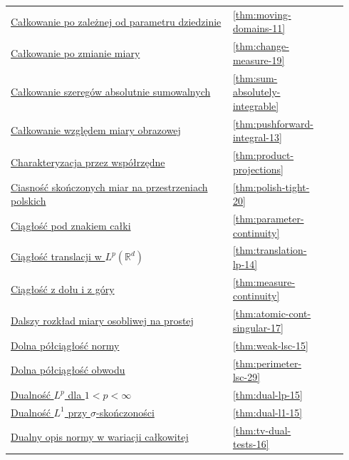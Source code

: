 \documentclass[11pt,a4paper,oneside]{book}
\numberwithin{equation}{chapter}
\theoremstyle{plain}
\theoremstyle{definition}
\theoremstyle{remark}
\begin{document}
\begin{longtable}{@{}p{0.72\linewidth}p{0.135\linewidth}p{0.08\linewidth}@{}}
\hyperref[thm:moving-domains-11]{Całkowanie po zależnej od parametru dziedzinie} & \ref*{thm:moving-domains-11} & \pageref*{thm:moving-domains-11} \\
\hyperref[thm:change-measure-19]{Całkowanie po zmianie miary} & \ref*{thm:change-measure-19} & \pageref*{thm:change-measure-19} \\
\hyperref[thm:sum-absolutely-integrable]{Całkowanie szeregów absolutnie sumowalnych} & \ref*{thm:sum-absolutely-integrable} & \pageref*{thm:sum-absolutely-integrable} \\
\hyperref[thm:pushforward-integral-13]{Całkowanie względem miary obrazowej} & \ref*{thm:pushforward-integral-13} & \pageref*{thm:pushforward-integral-13} \\
\hyperref[thm:product-projections]{Charakteryzacja przez współrzędne} & \ref*{thm:product-projections} & \pageref*{thm:product-projections} \\
\hyperref[thm:polish-tight-20]{Ciasność skończonych miar na przestrzeniach polskich} & \ref*{thm:polish-tight-20} & \pageref*{thm:polish-tight-20} \\
\hyperref[thm:parameter-continuity]{Ciągłość pod znakiem całki} & \ref*{thm:parameter-continuity} & \pageref*{thm:parameter-continuity} \\
\hyperref[thm:translation-lp-14]{Ciągłość translacji w $L^p(\mathbb R^d)$} & \ref*{thm:translation-lp-14} & \pageref*{thm:translation-lp-14} \\
\hyperref[thm:measure-continuity]{Ciągłość z dołu i z góry} & \ref*{thm:measure-continuity} & \pageref*{thm:measure-continuity} \\
\hyperref[thm:atomic-cont-singular-17]{Dalszy rozkład miary osobliwej na prostej} & \ref*{thm:atomic-cont-singular-17} & \pageref*{thm:atomic-cont-singular-17} \\
\hyperref[thm:weak-lsc-15]{Dolna półciągłość normy} & \ref*{thm:weak-lsc-15} & \pageref*{thm:weak-lsc-15} \\
\hyperref[thm:perimeter-lsc-29]{Dolna półciągłość obwodu} & \ref*{thm:perimeter-lsc-29} & \pageref*{thm:perimeter-lsc-29} \\
\hyperref[thm:dual-lp-15]{Dualność $L^p$ dla $1<p<\infty$} & \ref*{thm:dual-lp-15} & \pageref*{thm:dual-lp-15} \\
\hyperref[thm:dual-l1-15]{Dualność $L^1$ przy $\sigma$-skończoności} & \ref*{thm:dual-l1-15} & \pageref*{thm:dual-l1-15} \\
\hyperref[thm:tv-dual-tests-16]{Dualny opis normy w wariacji całkowitej} & \ref*{thm:tv-dual-tests-16} & \pageref*{thm:tv-dual-tests-16} \\

\end{longtable}
\end{document}
